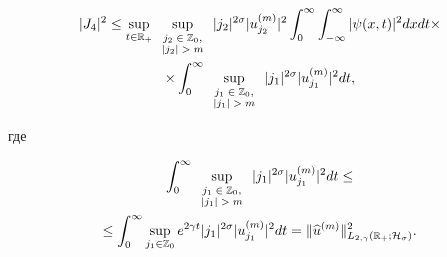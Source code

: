 \begin{multline*}

|J_4|^2 \le \sup_{t\in \mathbb R_{+}} 

\sup_{

\scriptsize

\begin{array}{c}

j_2\in \mathbb Z_0, \\ 

|j_2|> m

\end{array}

} |j_2|^{2\sigma} |u_{j_2}^{(m)}|^2 \int_0^\infty \int_{-\infty}^\infty 

|\psi(x,t)|^2 dxdt\times

\\

\times \int_0^\infty 

\sup_{

\scriptsize

\begin{array}{c}

j_1\in \mathbb Z_0, \\ 

|j_1|> m

\end{array}

} |j_1|^{2\sigma} |u_{j_1}^{(m)}|^2 dt,

\end{multline*} 

где

\begin{multline*}

\int_0^\infty 

\sup_{\scriptsize

\begin{array}{c}

j_1\in \mathbb Z_0, \\ 

|j_1|> m

\end{array}

}|j_1|^{2\sigma} |u_{j_1}^{(m)}|^2 dt\le

\\

\le \int_{0}^\infty \sup_{j_1\in \mathbb Z_0} e^{ 2\gamma t} |j_1|^{2\sigma} |u_{j_1}^{(m)}|^2 dt=\|\widehat{u}^{(m)}\|^2_{L_{2,\gamma}(\mathbb R_{+}; {\cal H}_{\sigma})}.

\end{multline*}

